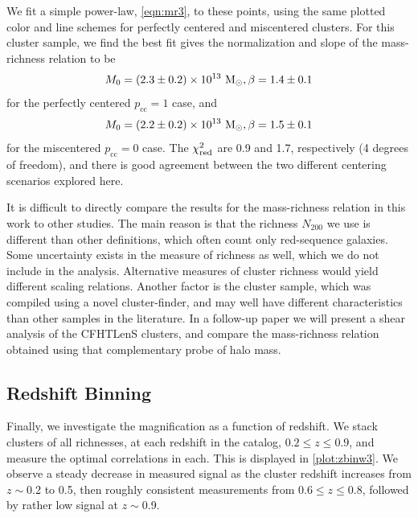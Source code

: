 We fit a simple power-law, \autoref{eqn:mr3}, to these points, using the same plotted color and line schemes for perfectly centered and miscentered clusters. For this cluster sample, we find the best fit gives the normalization and slope of the mass-richness relation to be
\begin{equation}
M_0 = (2.3 \pm 0.2) \times 10^{13}\ {\rm M}_\odot, \beta = 1.4 \pm 0.1
\end{equation}
for the perfectly centered $p_{\mathrm{cc}}=1$ case, and
\begin{equation}
M_0 = (2.2 \pm 0.2) \times 10^{13}\ {\rm M}_\odot, \beta = 1.5 \pm 0.1
\end{equation}
for the miscentered $p_{\mathrm{cc}}=0$ case. The $\chi^2_{\rm red}$ are 0.9 and 1.7, respectively (4 degrees of freedom), and there is good agreement between the two different centering scenarios explored here.

It is difficult to directly compare the results for the mass-richness relation in this work to other studies. The main reason is that the richness $N_{200}$ we use is different than other definitions, which often count only red-sequence galaxies. Some uncertainty exists in the measure of richness as well, which we do not include in the analysis. Alternative measures of cluster richness would yield different scaling relations. Another factor is the cluster sample, which was compiled using a novel cluster-finder, and may well have different characteristics than other samples in the literature. In a follow-up paper we will present a shear analysis of the \ac{CFHTLenS} clusters, and compare the mass-richness relation obtained using that complementary probe of halo mass.


\subsection{Redshift Binning}
\label{sec:zbin3}

Finally, we investigate the magnification as a function of redshift. We stack clusters of all richnesses, at each redshift in the catalog, $0.2 \leq z \leq 0.9$, and measure the optimal correlations in each. This is displayed in \autoref{plot:zbinw3}. We observe a steady decrease in measured signal as the cluster redshift increases from $z \sim$0.2 to 0.5, then roughly consistent measurements from 0.6$\leq z \leq$0.8, followed by rather low signal at $z \sim$0.9. 

